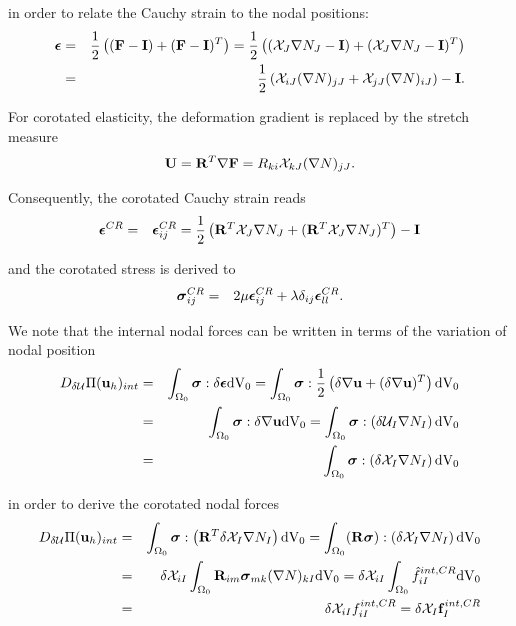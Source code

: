 in order to relate the Cauchy strain to the nodal positions:
\begin{eqnarray}
\boldsymbol{\epsilon} &=& \frac{1}{2} \left( (\mathbf {F } -  \mathbf {I } ) + (\mathbf {F } -  \mathbf {I }  )^T \right)  = \frac{1}{2} \left( (\mathcal{X} _J  \nabla  N_J  -  \mathbf {I })+ (\mathcal{X} _J  \nabla  N_J  -  \mathbf {I } )^T \right)  \notag \\
&=& \frac{1}{2} \left( \mathcal{X} _{iJ} (\nabla N )_{jJ} +  \mathcal{X} _{jJ} (\nabla N )_{iJ} \right) -  \mathbf {I }.
\end{eqnarray}

For corotated elasticity, the deformation gradient is replaced by the stretch measure
\begin{equation}
\mathbf {U } = \mathbf{R}^T \nabla \mathbf {F } = R_{ki} \mathcal{X} _{kJ}  (\nabla N )_{jJ}.
\end{equation}



Consequently, the corotated Cauchy strain reads
\begin{eqnarray}
\boldsymbol{\epsilon} ^{CR} &=& \boldsymbol{\epsilon}_{ij} ^{CR} = \frac{1}{2} \left( \mathbf{R}^T \mathcal{X} _J \nabla N_J  +  (\mathbf{R}^T \mathcal{X} _J \nabla N_J )^T \right) -  \mathbf {I }
\end{eqnarray}

and the corotated stress is derived to
\begin{eqnarray}
\boldsymbol{\sigma}_{ij} ^{CR} &=& 2\mu \boldsymbol{\epsilon}^{CR}_{ij} + \lambda \delta _{ij} \boldsymbol{\epsilon}^{CR}_{ll} \notag.
\end{eqnarray}

We note that the internal nodal forces can be written in terms of the variation of nodal position 
\begin{eqnarray}
D_{\delta \mathcal{U} } \Pi (\mathbf {u}  _h) _{int} &=& \int _{\Omega _0}  \boldsymbol{\sigma} : \delta \boldsymbol{\epsilon}   \textnormal{dV}_0 =  \int _{\Omega _0}  \boldsymbol{\sigma} : \frac{1}{2} \left( \delta \nabla \mathbf {u}  + (\delta \nabla \mathbf {u} )^T \right)   \textnormal{dV}_0 \notag\\
&=&  \int _{\Omega _0}  \boldsymbol{\sigma} :  \delta \nabla \mathbf {u}    \textnormal{dV}_0 = \int _{\Omega _0}  \boldsymbol{\sigma} : \left( \delta \mathcal{U} _I \nabla N_I  \right)  \textnormal{dV}_0 \notag\\
&=& \int _{\Omega _0}  \boldsymbol{\sigma} : \left( \delta \mathcal{X} _I \nabla N_I  \right)  \textnormal{dV}_0
\end{eqnarray}

in order to derive the corotated nodal forces
\begin{eqnarray}
D_{\delta \mathcal{U} } \Pi (\mathbf {u}  _h) _{int} &=& \int _{\Omega _0}  \boldsymbol{\sigma} : \left( \mathbf{R}^T \delta \mathcal{X} _I \nabla N_I  \right)  \textnormal{dV}_0 = \int _{\Omega _0}  (\mathbf{R} \boldsymbol{\sigma}) : \left(  \delta \mathcal{X} _I \nabla N_I  \right)  \textnormal{dV}_0 \notag \\
&=& \delta \mathcal{X} _{iI} \int _{\Omega _0}  \mathbf{R}_{im} \boldsymbol{\sigma}_{mk}  (\nabla N)_{kI}  \textnormal{dV}_0 = \delta \mathcal{X} _{iI} \int _{\Omega _0}  \hat{f} ^{int,CR}_{iI}   \textnormal{dV}_0  \notag \\
&=& \delta \mathcal{X} _{iI} f ^{int,CR}_{iI} = \delta \mathcal{X} _I \mathbf f ^{int,CR}_I
\end{eqnarray}

